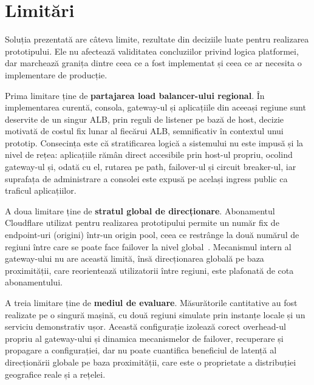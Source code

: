 \documentclass[12pt,a4paper]{report}
\begin{document}
\section{Limitări}
Soluția prezentată are câteva limite, rezultate din deciziile luate pentru realizarea prototipului. Ele nu afectează validitatea concluziilor privind logica platformei, dar marchează granița dintre ceea ce a fost implementat și ceea ce ar necesita o implementare de producție.

Prima limitare ține de \textbf{partajarea load balancer-ului regional}. În implementarea curentă, consola, gateway-ul și aplicațiile din aceeași regiune sunt deservite de un singur ALB, prin reguli de listener pe bază de host, decizie motivată de costul fix lunar al fiecărui ALB, semnificativ în contextul unui prototip. Consecința este că stratificarea logică a sistemului nu este impusă și la nivel de rețea: aplicațiile rămân direct accesibile prin host-ul propriu, ocolind gateway-ul și, odată cu el, rutarea pe path, failover-ul și circuit breaker-ul, iar suprafața de administrare a consolei este expusă pe același ingress public ca traficul aplicațiilor.

A doua limitare ține de \textbf{stratul global de direcționare}. Abonamentul Cloudflare utilizat pentru realizarea prototipului permite un număr fix de endpoint-uri (origini) într-un origin pool, ceea ce restrânge la două numărul de regiuni între care se poate face failover la nivel global~\cite{cloudflare-pools}. Mecanismul intern al gateway-ului nu are această limită, însă direcționarea globală pe baza proximității, care reorientează utilizatorii între regiuni, este plafonată de cota abonamentului.

A treia limitare ține de \textbf{mediul de evaluare}. Măsurătorile cantitative au fost realizate pe o singură mașină, cu două regiuni simulate prin instanțe locale și un serviciu demonstrativ ușor. Această configurație izolează corect overhead-ul propriu al gateway-ului și dinamica mecanismelor de failover, recuperare și propagare a configurației, dar nu poate cuantifica beneficiul de latență al direcționării globale pe baza proximității, care este o proprietate a distribuției geografice reale și a rețelei.
\end{document}
